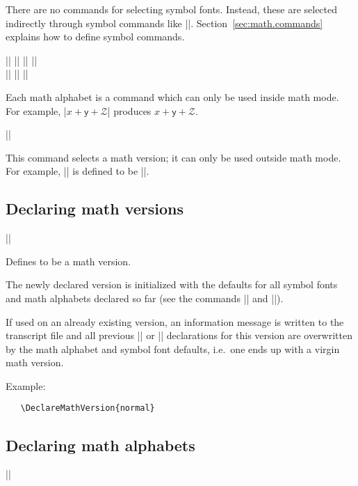 \documentclass{ltxguide}[1995/11/28]
\begin{document}
There are no commands for selecting symbol fonts.  Instead, these are
selected indirectly through symbol commands like |\oplus|.
Section~\ref{sec:math.commands} explains how to define symbol commands.

\begin{decl}
  || \quad
  || \quad
  || \quad
  || \\
  || \qquad
  || \qquad
  || 
\end{decl}
Each math alphabet is a command which can only be used inside math mode.
For example, |$x + \mathsf{y} + \mathcal{Z}$| produces
$x + \mathsf{y} + \mathcal{Z}$.

\begin{decl}
  ||
\end{decl}
This command selects a math version; it can only be used outside math
mode.  For example, |\boldmath| is defined to be ||.

\subsection{Declaring math versions}

\begin{decl}
  |\DeclareMathVersion| 
\end{decl}

Defines  to be a math version.

The newly declared version is initialized with the defaults for all
symbol fonts and math alphabets declared so far (see the commands
|\DeclareSymbolFont| and |\DeclareMathAlphabet|).

If used on an already existing version, an information message is
written to the transcript file and all previous |\SetSymbolFont| or
|\SetMathAlphabet| declarations for this version are overwritten by the
math alphabet and symbol font defaults, i.e.~one ends up with a virgin
math version.

Example:
\begin{verbatim}
   \DeclareMathVersion{normal}
\end{verbatim}

\subsection{Declaring math alphabets}

\begin{decl}
  |\DeclareMathAlphabet|   
                             
\end{decl}
\end{document}
